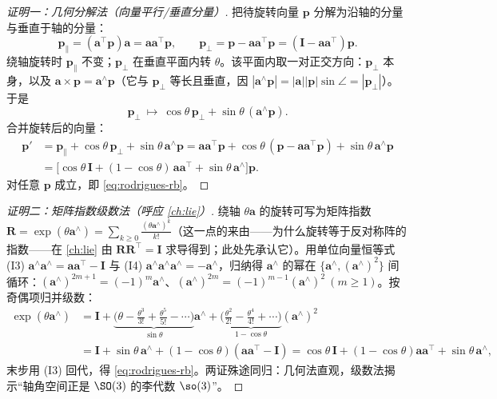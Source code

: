 \begin{proof}[证明一：几何分解法（向量平行/垂直分量）]
把待旋转向量 $\mathbf{p}$ 分解为沿轴的分量与垂直于轴的分量：
\[
  \mathbf{p}_\parallel=(\mathbf{a}^\top\mathbf{p})\mathbf{a}=\mathbf{a}\mathbf{a}^\top\mathbf{p},\qquad
  \mathbf{p}_\perp=\mathbf{p}-\mathbf{a}\mathbf{a}^\top\mathbf{p}=(\mathbf{I}-\mathbf{a}\mathbf{a}^\top)\mathbf{p}.
\]
绕轴旋转时 $\mathbf{p}_\parallel$ 不变；$\mathbf{p}_\perp$ 在垂直平面内转 $\theta$。该平面内取一对正交方向：$\mathbf{p}_\perp$ 本身，以及 $\mathbf{a}\times\mathbf{p}=\mathbf{a}^\wedge\mathbf{p}$（它与 $\mathbf{p}_\perp$ 等长且垂直，因 $|\mathbf{a}^\wedge\mathbf{p}|=|\mathbf{a}||\mathbf{p}|\sin\angle=|\mathbf{p}_\perp|$）。于是
\[
  \mathbf{p}_\perp\ \longmapsto\ \cos\theta\,\mathbf{p}_\perp+\sin\theta\,(\mathbf{a}^\wedge\mathbf{p}).
\]
合并旋转后的向量：
\begin{align*}
  \mathbf{p}'&=\mathbf{p}_\parallel+\cos\theta\,\mathbf{p}_\perp+\sin\theta\,\mathbf{a}^\wedge\mathbf{p}
   =\mathbf{a}\mathbf{a}^\top\mathbf{p}+\cos\theta\,(\mathbf{p}-\mathbf{a}\mathbf{a}^\top\mathbf{p})+\sin\theta\,\mathbf{a}^\wedge\mathbf{p}\\
  &=\big[\cos\theta\,\mathbf{I}+(1-\cos\theta)\,\mathbf{a}\mathbf{a}^\top+\sin\theta\,\mathbf{a}^\wedge\big]\mathbf{p}.
\end{align*}
对任意 $\mathbf{p}$ 成立，即 \cref{eq:rodrigues-rb}。
\end{proof}

\begin{proof}[证明二：矩阵指数级数法（呼应 \cref{ch:lie}）]
绕轴 $\theta\mathbf{a}$ 的旋转可写为矩阵指数 $\mathbf{R}=\exp(\theta\mathbf{a}^\wedge)=\sum_{k\ge0}\frac{(\theta\mathbf{a}^\wedge)^k}{k!}$（这一点的来由——为什么旋转等于反对称阵的指数——在 \cref{ch:lie} 由 $\mathbf{R}\mathbf{R}^\top=\mathbf{I}$ 求导得到；此处先承认它）。用单位向量恒等式 (I3) $\mathbf{a}^\wedge\mathbf{a}^\wedge=\mathbf{a}\mathbf{a}^\top-\mathbf{I}$ 与 (I4) $\mathbf{a}^\wedge\mathbf{a}^\wedge\mathbf{a}^\wedge=-\mathbf{a}^\wedge$，归纳得 $\mathbf{a}^\wedge$ 的幂在 $\{\mathbf{a}^\wedge,(\mathbf{a}^\wedge)^2\}$ 间循环：$(\mathbf{a}^\wedge)^{2m+1}=(-1)^m\mathbf{a}^\wedge$、$(\mathbf{a}^\wedge)^{2m}=(-1)^{m-1}(\mathbf{a}^\wedge)^2\ (m\ge1)$。按奇偶项归并级数：
\begin{align*}
  \exp(\theta\mathbf{a}^\wedge)
  &=\mathbf{I}+\underbrace{\Big(\theta-\tfrac{\theta^3}{3!}+\tfrac{\theta^5}{5!}-\cdots\Big)}_{\sin\theta}\mathbf{a}^\wedge
   +\underbrace{\Big(\tfrac{\theta^2}{2!}-\tfrac{\theta^4}{4!}+\cdots\Big)}_{1-\cos\theta}(\mathbf{a}^\wedge)^2\\
  &=\mathbf{I}+\sin\theta\,\mathbf{a}^\wedge+(1-\cos\theta)(\mathbf{a}\mathbf{a}^\top-\mathbf{I})
   =\cos\theta\,\mathbf{I}+(1-\cos\theta)\mathbf{a}\mathbf{a}^\top+\sin\theta\,\mathbf{a}^\wedge,
\end{align*}
末步用 (I3) 回代，得 \cref{eq:rodrigues-rb}。两证殊途同归：几何法直观，级数法揭示“轴角空间正是 $\SO(3)$ 的李代数 $\so(3)$”。
\end{proof}

